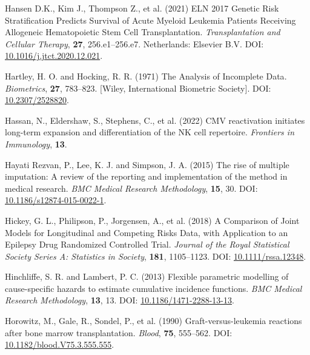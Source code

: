 \documentclass[
  letterpaper,
  DIV=11,
  numbers=noendperiod]{scrreprt}
\newlength{\cslhangindent}
\newlength{\cslentryspacingunit} %
\newenvironment{CSLReferences}[2] %
 {%
  \setlength{\parindent}{0pt}
  \ifodd #1
  \let\oldpar\par
  \def\par{\hangindent=\cslhangindent\oldpar}
  \fi
  \setlength{\parskip}{#2\cslentryspacingunit}
 }%
 {}
\begin{document}
\begin{CSLReferences}{1}{0}
\leavevmode{}%
Hansen D.K., Kim J., Thompson Z., et al. (2021) {ELN} 2017 {Genetic Risk
Stratification Predicts Survival} of {Acute Myeloid Leukemia Patients
Receiving Allogeneic Hematopoietic Stem Cell Transplantation}.
\emph{Transplantation and Cellular Therapy}, \textbf{27},
256.e1--256.e7. Netherlands: Elsevier B.V. DOI:
\href{https://doi.org/10.1016/j.jtct.2020.12.021}{10.1016/j.jtct.2020.12.021}.

\leavevmode{}%
Hartley, H. O. and Hocking, R. R. (1971) The {Analysis} of {Incomplete
Data}. \emph{Biometrics}, \textbf{27}, 783--823. {[}Wiley, International
Biometric Society{]}. DOI:
\href{https://doi.org/10.2307/2528820}{10.2307/2528820}.

\leavevmode{}%
Hassan, N., Eldershaw, S., Stephens, C., et al. (2022) {CMV}
reactivation initiates long-term expansion and differentiation of the
{NK} cell repertoire. \emph{Frontiers in Immunology}, \textbf{13}.

\leavevmode{}%
Hayati Rezvan, P., Lee, K. J. and Simpson, J. A. (2015) The rise of
multiple imputation: A review of the reporting and implementation of the
method in medical research. \emph{BMC Medical Research Methodology},
\textbf{15}, 30. DOI:
\href{https://doi.org/10.1186/s12874-015-0022-1}{10.1186/s12874-015-0022-1}.

\leavevmode{}%
Hickey, G. L., Philipson, P., Jorgensen, A., et al. (2018) A
{Comparison} of {Joint Models} for {Longitudinal} and {Competing Risks
Data}, with {Application} to an {Epilepsy Drug Randomized Controlled
Trial}. \emph{Journal of the Royal Statistical Society Series A:
Statistics in Society}, \textbf{181}, 1105--1123. DOI:
\href{https://doi.org/10.1111/rssa.12348}{10.1111/rssa.12348}.

\leavevmode{}%
Hinchliffe, S. R. and Lambert, P. C. (2013) Flexible parametric
modelling of cause-specific hazards to estimate cumulative incidence
functions. \emph{BMC Medical Research Methodology}, \textbf{13}, 13.
DOI:
\href{https://doi.org/10.1186/1471-2288-13-13}{10.1186/1471-2288-13-13}.

\leavevmode{}%
Horowitz, M., Gale, R., Sondel, P., et al. (1990) Graft-versus-leukemia
reactions after bone marrow transplantation. \emph{Blood}, \textbf{75},
555--562. DOI:
\href{https://doi.org/10.1182/blood.V75.3.555.555}{10.1182/blood.V75.3.555.555}.


\end{CSLReferences}
\end{document}
